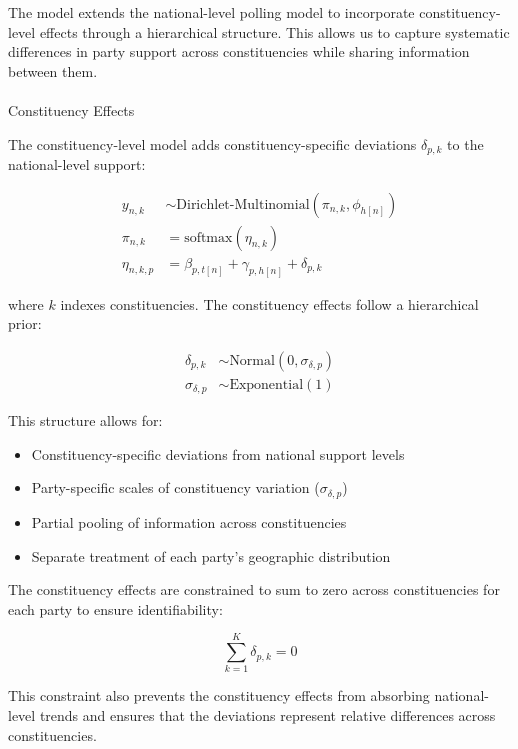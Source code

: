 \documentclass[
  letterpaper,
  DIV=11,
  numbers=noendperiod]{scrartcl}
\makeatletter
\let\oldparagraph\paragraph
\renewcommand{\paragraph}{
    \@ifstar
      \xxxParagraphStar
      \xxxParagraphNoStar
  }
\newcommand{\xxxParagraphStar}[1]{\oldparagraph*{#1}\mbox{}}
\newcommand{\xxxParagraphNoStar}[1]{\oldparagraph{#1}\mbox{}}
\providecommand{\tightlist}{%
  \setlength{\itemsep}{0pt}\setlength{\parskip}{0pt}}\usepackage{longtable,booktabs,array}
\makeatother
\begin{document}
The model extends the national-level polling model to incorporate
constituency-level effects through a hierarchical structure. This allows
us to capture systematic differences in party support across
constituencies while sharing information between them.

\paragraph{Constituency Effects}\label{constituency-effects}

The constituency-level model adds constituency-specific deviations
\(\delta_{p,k}\) to the national-level support:

\[
\begin{aligned}
y_{n,k} &\sim \text{Dirichlet-Multinomial}(\pi_{n,k}, \phi_{h[n]}) \\
\pi_{n,k} &= \text{softmax}(\eta_{n,k}) \\
\eta_{n,k,p} &= \beta_{p,t[n]} + \gamma_{p,h[n]} + \delta_{p,k}
\end{aligned}
\]

where \(k\) indexes constituencies. The constituency effects follow a
hierarchical prior:

\[
\begin{aligned}
\delta_{p,k} &\sim \text{Normal}(0, \sigma_{\delta,p}) \\
\sigma_{\delta,p} &\sim \text{Exponential}(1)
\end{aligned}
\]

This structure allows for:

\begin{itemize}
\tightlist
\item
  Constituency-specific deviations from national support levels
\item
  Party-specific scales of constituency variation
  (\(\sigma_{\delta,p}\))
\item
  Partial pooling of information across constituencies
\item
  Separate treatment of each party's geographic distribution
\end{itemize}

The constituency effects are constrained to sum to zero across
constituencies for each party to ensure identifiability:

\[
\sum_{k=1}^K \delta_{p,k} = 0
\]

This constraint also prevents the constituency effects from absorbing
national-level trends and ensures that the deviations represent relative
differences across constituencies.
\end{document}
